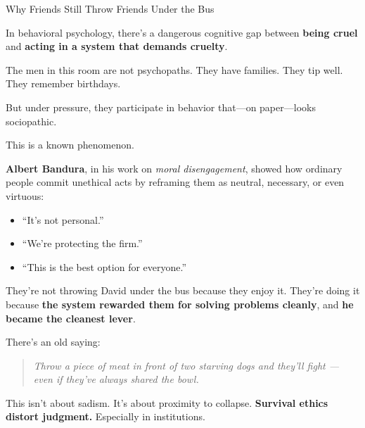 \begin{PsychologicalSidebar}{Why Friends Still Throw Friends Under the Bus}

    In behavioral psychology, there's a dangerous cognitive gap between \textbf{being cruel}
    and \textbf{acting in a system that demands cruelty}.
    
    \medskip
    
    The men in this room are not psychopaths.  
    They have families. They tip well. They remember birthdays.

    \medskip
    
    But under pressure, they participate in behavior that—on paper—looks sociopathic.
    
    \medskip
    
    This is a known phenomenon.

    \medskip
    
    
    \textbf{Albert Bandura}, in his work on \textit{moral disengagement}, showed how ordinary 
    people commit unethical acts by reframing them as neutral, necessary, or even virtuous:

    \medskip
    
    \begin{itemize}
        \item “It’s not personal.”
        \item “We’re protecting the firm.”
        \item “This is the best option for everyone.”
    \end{itemize}
    
    \medskip
    
    They’re not throwing David under the bus because they enjoy it.  
    They’re doing it because \textbf{the system rewarded them for solving problems cleanly}, 
    and \textbf{he became the cleanest lever}.
    
    \medskip
    
    There’s an old saying:
    \begin{quote}
        \textit{Throw a piece of meat in front of two starving dogs and they’ll fight --- \\
        even if they’ve always shared the bowl.}
    \end{quote}
    
    \medskip
    
    This isn’t about sadism.  
    It’s about proximity to collapse.  
    \textbf{Survival ethics distort judgment.} 
    Especially in institutions.
    

\end{PsychologicalSidebar}
